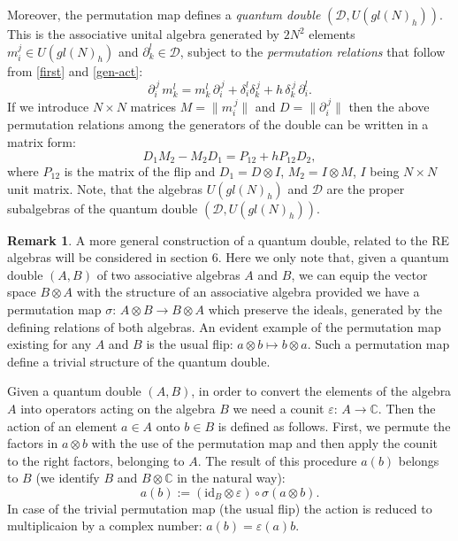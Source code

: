 \documentclass[11pt]{article}
\newcommand{\pa}{\partial}
\newcommand{\ot}{\otimes}
\newcommand{\C}{\mathbb{C}}
\newcommand{\DD}{\mathcal{D}}
\numberwithin{equation}{section}
\theoremstyle{plain}
\theoremstyle{definition}
\newtheorem{remark}[theorem]{Remark}
\begin{document}
Moreover, the permutation map defines a \emph{quantum double} $(\DD,U(gl(N)_h))$. This is the associative unital algebra generated by
$2N^2$ elements $m_i^j\in U(gl(N)_h)$ and $\partial_k^l\in\DD$, subject to the \emph{permutation relations} that follow
from \eqref{first} and \eqref{gen-act}:
\begin{equation}
\pa_i^{\,j}\, m_k^l = m_k^l\,\partial_i^{\,j} +\delta_i^l\delta_k^{\,j}+ h\,\delta_k^{\,j}\,\partial_i^l.
\label{perrel}
\end{equation}
If we introduce $N\times N$ matrices $M = \|m_i^{\,j}\|$ and $D = \|\partial_i^{\,j}\|$ then the above permutation relations among the
generators of the double can be written in a matrix form:
\[
D_1M_2 - M_2D_1 = P_{12} +hP_{12}D_2,
\]
where $P_{12}$ is the matrix of the flip and $D_1 = D\otimes I$, $M_2 = I\otimes M$, $I$ being $N\times N$ unit matrix. Note, that
the algebras $U(gl(N)_h)$ and $\DD$ are the proper subalgebras of the quantum double $(\DD, U(gl(N)_h))$.

\begin{remark}
\label{rem:1}
A more general construction of a quantum double, related to the RE algebras will be considered in section 6. Here we only note that,
given a quantum double $(A,B)$ of two associative algebras $A$ and $B$, we can equip the vector space $B\otimes A$ with
the structure of an associative algebra provided we have a permutation map $\sigma: \,A\otimes B\rightarrow B\otimes A$ which preserve
the ideals, generated by the defining relations of both algebras. An evident example of the permutation map existing for any $A$ and
$B$ is the usual flip: $a\otimes b\mapsto b\otimes a$. Such a permutation map define a trivial structure of the quantum double.

Given a quantum double $(A, B)$, in order to convert the elements of the algebra $A$ into operators acting on the algebra $B$ we need a counit $ \varepsilon:\,A\to \C$.
Then the action of an element $a\in A$ onto $b\in B$ is defined as follows. First, we permute
the factors in $a\ot b$  with the use of the permutation map and then apply the counit to the right factors, belonging to $A$. The result of
this procedure $a(b)$ belongs to $B$ (we identify $B$ and $B\ot \C$ in the natural way):
\[
a(b) := (\mathrm{id}_B\otimes \varepsilon)\circ\sigma(a\otimes b).
\]
In case of the trivial permutation map (the usual flip) the action is reduced to multiplicaion by a complex number:
$a(b) = \varepsilon(a) b$.
\end{remark}
\end{document}
